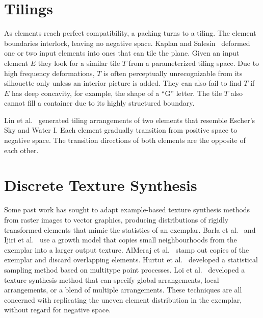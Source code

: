
\section{Tilings}
As elements reach perfect compatibility, a packing turns to a tiling.
The element boundaries interlock, leaving no negative space.
Kaplan and Salesin~\cite{Kaplan2000, Blah} deformed one or two 
input elements into ones that can tile the plane.
Given an input element $E$ they look for a similar tile $T$
from a parameterized tiling space.
Due to high frequency deformations,
$T$ is often perceptually unrecognizable from its silhouette only unless an interior picture is added.
They can also fail to find $T$ if $E$ has deep concavity, for example, the shape of a ``G'' letter.
The tile $T$  also cannot fill a container due to its highly structured boundary.

Lin et al.~\cite{Lin2018} generated tiling arrangements of two elements that resemble Escher's Sky and Water I.
Each element gradually transition from positive space to negative space. 
The transition directions of both elements are the opposite of each other.



\section{Discrete Texture Synthesis}
Some past work has sought to adapt example-based texture synthesis methods
from raster images to vector graphics, producing distributions of rigidly transformed elements
that mimic the statistics of an exemplar.  Barla et al.~\cite{Barla2006} and
Ijiri et al.~\cite{Ijiri2008} use a growth model that copies small neighbourhoods
from the exemplar into a larger output texture.  AlMeraj et al.~\cite{AlMeraj2013}
stamp out copies of the exemplar and discard overlapping elements.
Hurtut et al.~\cite{Hurtut2009} developed a statistical sampling method based
on multitype point processes.  
Loi et al.~\cite{Loi2017} developed a texture synthesis method that
can specify global arrangements, local arrangements, or a blend of multiple arrangements.
These techniques are all concerned with replicating
the uneven element distribution in the exemplar, without regard for negative space.

